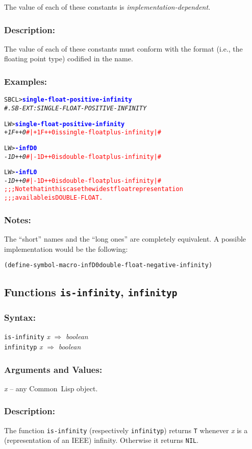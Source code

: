 \documentclass[10pt,fleqn]{article}
\newcommand{\CL}{\textsf{Common~Lisp}}
\newcommand{\code}[1]{\texttt{#1}}
\newcommand{\varname}[1]{\textit{#1}}
\newcommand{\codeprompt}[1]{\textcolor{blue}{\textbf{#1}}}
\newcommand{\DDictionaryItem}[1]{\vspace*{6pt}\noindent\hrulefill\vspace*{-9pt}\subsection*{#1}}
\newcommand{\DSyntax}{\subsubsection*{Syntax:}}
\newcommand{\DArgsNValues}{\subsubsection*{Arguments and Values:}}
\newcommand{\DDescription}{\subsubsection*{Description:}}
\newcommand{\DExamples}{\subsubsection*{Examples:}}
\newcommand{\DNotes}{\subsubsection*{Notes:}}
\begin{document}
The value of each of these constants is
\emph{implementation-dependent}.


\DDescription{}

The value of each of these constants must conform with the format
(i.e., the floating point type) codified in the name.


\DExamples{}

\begin{alltt}
SBCL> \codeprompt{single-float-positive-infinity}
\textit{#.SB-EXT:SINGLE-FLOAT-POSITIVE-INFINITY}
\end{alltt}

\begin{alltt}
LW> \codeprompt{single-float-positive-infinity}
\textit{+1F++0} \textcolor{red}{#| +1F++0 is single-float plus-infinity |#}
\end{alltt}

\begin{alltt}
LW> \codeprompt{-infD0}
\textit{-1D++0} \textcolor{red}{#| -1D++0 is double-float plus-infinity |#}
\end{alltt}

\begin{alltt}
LW> \codeprompt{-infL0}
\textit{-1D++0} \textcolor{red}{#| -1D++0 is double-float plus-infinity |#}
\textcolor{red}{;;; Note that in this case the widest float representation
;;; available is DOUBLE-FLOAT.}
\end{alltt}


\DNotes{}

The ``short'' names and the ``long ones'' are completely equivalent.
A possible implementation would be the following:
\begin{alltt}
(define-symbol-macro -infD0 double-float-negative-infinity)
\end{alltt}


\DDictionaryItem{Functions \code{is-infinity}, \code{infinityp}}

\DSyntax{}

\code{is-infinity} \varname{x} $\Rightarrow$ \textit{boolean}\\
\code{infinityp} \varname{x} $\Rightarrow$ \textit{boolean}

\DArgsNValues{}

\varname{x} -- any \CL{} object.

\DDescription{}

The function \code{is-infinity} (respectively \code{infinityp}) returns \code{T}
whenever \varname{x} is a (representation of an IEEE) infinity.  Otherwise
it returns \code{NIL}.
\end{document}
